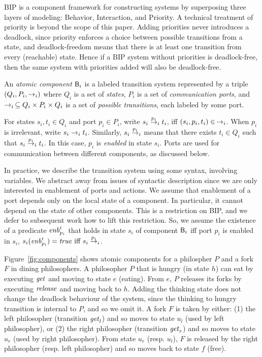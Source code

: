 
BIP is a component framework for constructing systems by superposing three layers of modeling: Behavior, Interaction,
and Priority.
%
A technical treatment of priority is beyond the scope of this paper. Adding priorities never introduces a deadlock,
since priority enforces a choice between possible transitions from a state, and deadlock-freedom means that there is at
least one transition from every (reachable) state.  Hence if a BIP system without priorities is deadlock-free, then the
same system with priorities added will also be deadlock-free.

An  {\em atomic component} $\B_i$ is a labeled transition system represented by a triple
$(Q_i, P_i, \goesto_i)$ where $Q_i$ is a set of {\em states}, $P_i$ is a set of {\em communication ports}, and
$\goesto_i\, \subseteq Q_i \times P_i \times Q_i$ is a set of {\em possible transitions}, each labeled by some port.
\ed

For states $s_i, t_i \in Q_i$ and port $p_i \in P_i$, write $s_i  \goesto[p_i]_i t_i$, iff
$(s_i,p_i,t_i) \in\,\goesto_i$. When $p_i$ is irrelevant, write 
$s_i \goesto_i t_i$. Similarly, $s_i \goesto[p_i]_i$ means that there
exists $t_i \in Q_i$ such that
$s_i \goesto[p_i]_i t_i$. In this case, $p_i$ is \emph{enabled} in state $s_i$.
Ports are used for communication between different components, as
discussed below.

In practice, we describe the transition system using some syntax, \eg involving variables.  We abstract away from issues
of syntactic description since we are only interested in enablement of ports and actions. We assume that enablement of a
port depends only on the local state of a component. In particular, it cannot depend on the state of other
components. This is a restriction on BIP, and we defer to subsequent work how to lift this restriction.  So, we assume
the existence of a predicate $\gd{p_i}{i}$ that holds in state $s_i$ of component $\B_i$ iff port $p_i$ is enabled in
$s_i$, \ie $s_i(\gd{p_i}{i}) = \true \mbox{ iff } s_i \goesto[p_i]_i$.

Figure~\ref{fig:components} shows atomic components for a philospher $P$
and a fork $F$ in dining philosophers.
%
A philosopher $P$ that is hungry (in state $h$) can eat by
executing $\get$ and moving to state $e$ (eating). From $e$, $P$
releases its forks by executing $\release$ and moving back to $h$.
%
Adding the thinking state does not change the deadlock behaviour of the system, since the
thinking to hungry transition is internal to $P$, and so we omit it.
%
A fork $F$ is taken by either: (1) the left philosopher 
(transition $\get_l$) and so moves to state $u_l$ (used by left
philosopher), or (2) the right philosopher  (transition
$\get_r$) and so moves to state $u_r$ (used by right
philosopher). From state $u_r$ (resp. $u_l$), $F$ is released by the
right philosopher (resp. left philosopher) and so moves back to
state $f$ (free).



